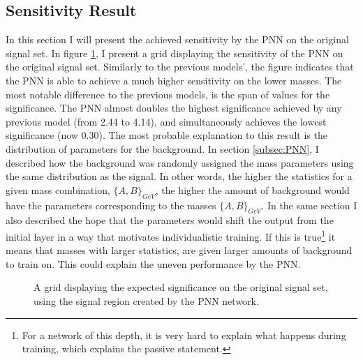 \subsection{Sensitivity Result}
In this section I will present the achieved sensitivity by the \ac{PNN} on the original signal set. In figure \ref{fig:PNNGridSig}, I present a grid displaying the sensitivity 
of the \ac{PNN} on the original signal set. Similarly to the previous models', the figure indicates that the \ac{PNN} is able to achieve a much higher sensitivity on the lower
masses. The most notable difference to the previous models, is the span of values for the significance. The \ac{PNN} almost doubles the highest significance achieved by any previous model
(from 2.44 to 4.14), and simultaneously achieves the lowest significance (now 0.30). The most probable explanation to this result is the distribution of parameters for the background. 
In section \ref{subsec:PNN}, I described how the background was randomly assigned the mass parameters using the same distribution as the signal. In other words, the higher the statistics 
for a given mass combination, $\{A,B\}_{GeV}$, the higher the amount of background would have the parameters corresponding to the masses $\{A,B\}_{GeV}$. In the 
same section I also described the hope that the parameters would shift the output from the initial layer in a way that motivates individualistic training. If this is 
true\footnote{For a network of this depth, it is very hard to explain what happens during training, which explains the passive statement.} it means that masses with larger statistics, 
are given larger amounts of background to train on. This could explain the uneven performance by the \ac{PNN}. \\
\begin{figure}[H]
    \caption{A grid displaying the expected significance on the original signal set, using the signal region 
    created by the \acs{PNN} network.}
    \label{fig:PNNGridSig}
\end{figure}
